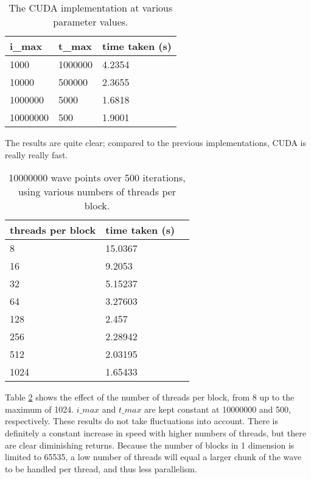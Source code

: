 \documentclass[a4paper]{article}
\begin{document}
\begin{table}[htbp]
    \centering
    \begin{tabular}{|l|l|l|}
        \hline
        i\_max & t\_max & time taken (s) \\
        \hline
        1000     & 1000000 & 4.2354 \\
        10000    & 500000  & 2.3655 \\
        1000000  & 5000    & 1.6818 \\
        10000000 & 500     & 1.9001 \\
        \hline
    \end{tabular}
    \caption{The CUDA implementation at various parameter values.}
    \label{table:cuda}
\end{table}

The results are quite clear; compared to the previous implementations, CUDA is
really really fast.

\begin{table}[htbp]
    \centering
    \begin{tabular}{|l|l|l}
        \hline
        threads per block & time taken (s) \\
        \hline
        8    & 15.0367 \\
        16   & 9.2053 \\
        32   & 5.15237 \\
        64   & 3.27603 \\
        128  & 2.457 \\
        256  & 2.28942 \\
        512  & 2.03195 \\
        1024 & 1.65433 \\
        \hline
    \end{tabular}
    \caption{10000000 wave points over 500 iterations, using various numbers of
    threads per block.}
    \label{table:threads}
\end{table}

Table \ref{table:threads} shows the effect of the number of threads per block,
from 8 up to the maximum of 1024. $i\_max$ and $t\_max$ are kept constant at
10000000 and 500, respectively. These results do not take fluctuations into
account. There is definitely a constant increase in speed with higher numbers of
threads, but there are clear diminishing returns. Because the number of blocks
in 1 dimension is limited to 65535, a low number of threads will equal a larger
chunk of the wave to be handled per thread, and thus less parallelism.
\end{document}
